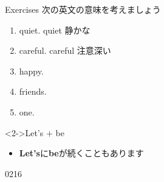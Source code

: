 \documentclass[aspectratio=169,xcolor={dvipsnames,table}]{beamer}
\begin{document}
\begin{frame}[plain]{Exercises}
次の英文の意味を考えましょう

 \begin{enumerate}
  \item {}  quiet.%
\hfill{\scriptsize quiet  静かな}
  \item {}  careful.%
\hfill{\scriptsize careful  注意深い}
  \item {}  happy.
  \item {}  friends.
  \item {}  one.
 \end{enumerate}

\vfill

\begin{block}<2->{Let's $+$ be}
\begin{itemize}[square]\small
 \item \textbf{Let's}に\textbf{be}が続くこともあります
\end{itemize}
\end{block}
\hfill{\tiny 0216}\,{\scriptsize {}}

\end{frame}
\end{document}
